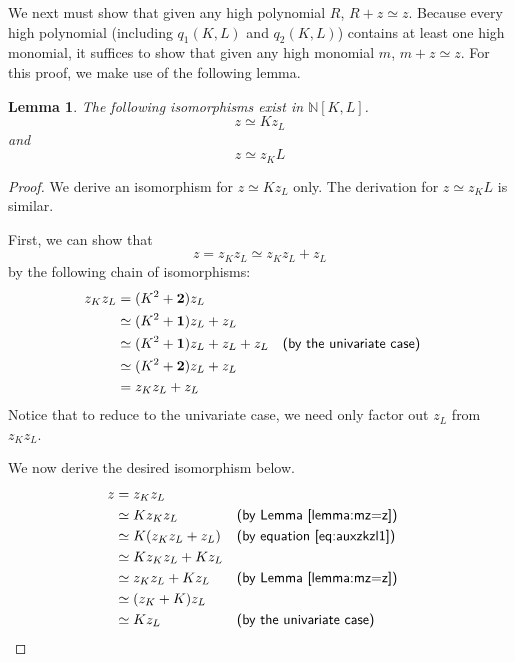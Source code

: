 \documentclass{msthesis}
\newtheorem{lemma}[theorem]{Lemma}
\theoremstyle{definition}
\newcommand{\nat}{\mathbb{N}}
\begin{document}
We next must show that given any high polynomial $R$, $R + z \simeq z$. Because every high polynomial (including $q_1(K, L)$ and $q_2(K, L)$) contains at least one high monomial, it suffices to show that given any high monomial $m$, $m + z \simeq z$.  For this proof, we make use of the following lemma.

\begin{lemma}\label{lemma:auxz1}
    The following isomorphisms exist in $\nat[K,L]$.
    \[ z \simeq  Kz_L\]
    and
    \[ z \simeq z_KL\]
\end{lemma}
\begin{proof}
    We derive an isomorphism for $z \simeq Kz_L$ only.  The derivation for $z \simeq z_KL$ is similar.
    
    First, we can show that
    \begin{equation}\label{eq:auxzkzl1}
        z = z_Kz_L \simeq z_Kz_L + z_L
    \end{equation}
    by the following chain of isomorphisms:
    \begin{equation*}
    \begin{aligned}
        z_Kz_L 
        &= (K^2 + \mathbf{2})z_L \\
        &\simeq (K^2 + \mathbf{1})z_L + z_L \\
        &\simeq (K^2 + \mathbf{1})z_L + z_L + z_L && \textsf{(by the univariate case)} \\
        &\simeq (K^2 + \mathbf{2})z_L + z_L \\
        &= z_Kz_L + z_L
    \end{aligned}
    \end{equation*}
    Notice that to reduce to the univariate case, we need only factor out $z_L$ from $z_Kz_L$.

    We now derive the desired isomorphism below.
    \begin{align*}
        z 
        &= z_Kz_L \\
        &\simeq Kz_Kz_L && \textsf{(by Lemma \ref{lemma:mz=z})} \\
        &\simeq K(z_Kz_L + z_L)  && \textsf{(by equation \eqref{eq:auxzkzl1})} \\
        &\simeq Kz_Kz_L + Kz_L \\
        &\simeq z_Kz_L + Kz_L && \textsf{(by Lemma \ref{lemma:mz=z})} \\
        &\simeq (z_K + K)z_L \\
        &\simeq Kz_L && \textsf{(by the univariate case)}
    \end{align*}
\end{proof}
\end{document}
